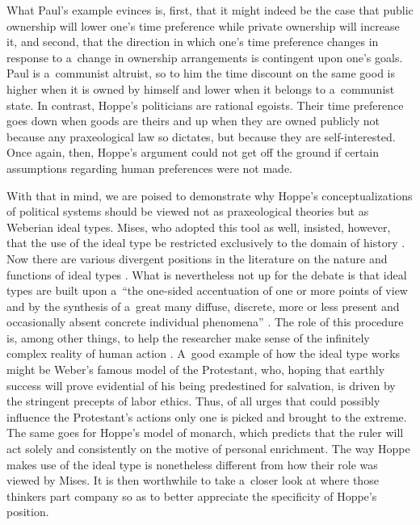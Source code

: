 What Paul's example evinces is, first, that it might indeed be the case that public ownership will lower one's time preference while private ownership will increase it, and second, that the direction in which one's time preference changes in response to a~change in ownership arrangements is contingent upon one's goals. Paul is a~communist altruist, so to him the time discount on the same good is higher when it is owned by himself and lower when it belongs to a~communist state. In contrast, Hoppe's politicians are rational egoists. Their time preference goes down when goods are theirs and up when they are owned publicly not because any praxeological law so dictates, but because they are self-interested. Once again, then, Hoppe's argument could not get off the ground if certain assumptions regarding human preferences were not made.



With that in mind, we are poised to demonstrate why Hoppe's conceptualizations of political systems should be viewed not as praxeological theories but as Weberian ideal types. Mises, who adopted this tool as well, insisted, however, that the use of the ideal type be restricted exclusively to the domain of history 
\parencites[][pp.59–64]{mises_human_1998}[][pp.315–322]{mises_theory_2007}. %
 Now there are various divergent positions in the literature on the nature and functions of ideal types 
\parencite[see][pp.35–119]{kuninski_myslenie_1980}. %
 What is nevertheless not up for the debate is that ideal types are built upon a~``the one-sided accentuation of one or more points of view and by the synthesis of a~great many diffuse, discrete, more or less present and occasionally absent concrete individual phenomena'' 
\parencites[][p.90]{weber_methodology_1949}[see also][pp.315–320]{mises_theory_2007}. %
 The role of this procedure is, among other things, to help the researcher make sense of the infinitely complex reality of human action 
\parencite[][p.320]{mises_theory_2007}. %
 A~good example of how the ideal type works might be Weber's 
\parencite*[][]{weber_protestant_2001} %
 famous model of the Protestant, who, hoping that earthly success will prove evidential of his being predestined for salvation, is driven by the stringent precepts of labor ethics. Thus, of all urges that could possibly influence the Protestant's actions only one is picked and brought to the extreme. The same goes for Hoppe's model of monarch, which predicts that the ruler will act solely and consistently on the motive of personal enrichment. The way Hoppe makes use of the ideal type is nonetheless different from how their role was viewed by Mises. It is then worthwhile to take a~closer look at where those thinkers part company so as to better appreciate the specificity of Hoppe's position.



